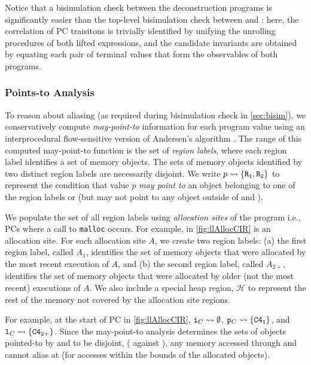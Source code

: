 Notice that a bisimulation check between the deconstruction programs is
significantly easier than the top-level bisimulation check between \sprog{} and \cprog{}:
here, the correlation of PC traisitons is trivially identified by unifying the
unrolling procedures of both lifted expressions, and the candidate invariants
are obtained by equating each pair of terminal values that form the observables
of both programs.

\subsubsection{Points-to Analysis}
\label{sec:pointsTo}
To reason about aliasing (as required during bisimulation check in \cref{sec:bisim}),
we conservatively compute {\em may-point-to} information for each program value using
an interprocedural flow-sensitive version of Andersen's algorithm \cite{andersen94programanalysis}.
The range of this computed may-point-to function is the set of {\em region labels},
where each region label identifies a set of memory objects.
The sets of memory objects identified by two distinct region labels
are necessarily disjoint.
We write $p \rightsquigarrow{} \{ {\tt R_1}, {\tt R_2} \}$ to represent the condition that value $p$
{\em may point to} an object belonging to one of the region labels  or 
(but may not point to any object outside of  and ).

We populate the set of all region labels using {\em allocation sites} of the \cprog{} program
i.e., PCs where a call to {\tt malloc} occurs.
For example,  in \cref{fig:llAllocCIR} is an allocation site.
For each allocation site $A$, we create two region labels:
(a) the first region label, called $A_1$, identifies the set of memory objects
that were allocated by the most recent execution of $A$, and (b) the second region
label, called $A_{2+}$, identifies the set of memory objects that were allocated
by older (not the most recent) executions of $A$.
We also include a special heap region, $\mathcal{H}$ to represent
the rest of the memory not covered by the allocation site regions.

For example, at the start of PC  in \cref{fig:llAllocCIR},
${\tt i}_{C} \rightsquigarrow{} \emptyset$, ${\tt p}_{C} \rightsquigarrow{} \{ {\tt {\tt C4}_1} \}$,
and ${\tt l}_{C} \rightsquigarrow{} \{ {\tt {\tt C4}_{2+}} \}$.
Since the may-point-to analysis determines the sets of objects pointed-to
by  and  to be disjoint, ( against ),
any memory accessed through  and  cannot alias at 
(for accesses within the bounds of the allocated objects).

